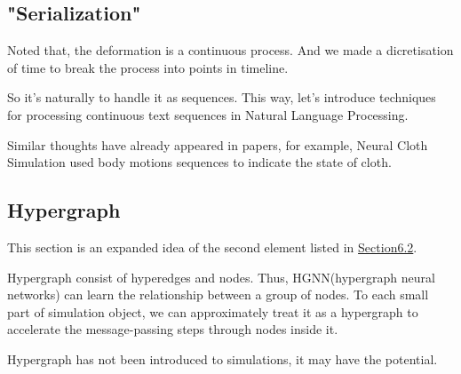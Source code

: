 \documentclass{article}
\begin{document}
\subsection{"Serialization"}
\par Noted that, the deformation is a continuous process. And we made a dicretisation of time to break the process into points in timeline.
\par So it's naturally to handle it as sequences. This way, let's introduce techniques for processing continuous text sequences in Natural Language Processing.
\par Similar thoughts have already appeared in papers, for example, Neural Cloth Simulation\cite{bertiche2022neural} used body motions sequences to indicate the state of cloth.
\subsection{Hypergraph}
\par This section is an expanded idea of the second element listed in \href{subsection.6.2}{Section6.2}.
\par Hypergraph consist of hyperedges and nodes. Thus, HGNN(hypergraph neural networks) can learn the relationship between a group of nodes. To each small part of simulation object, we can approximately treat it as a hypergraph to accelerate the message-passing steps through nodes inside it.
\par Hypergraph has not been introduced to simulations, it may have the potential.

\newpage


\end{document}
